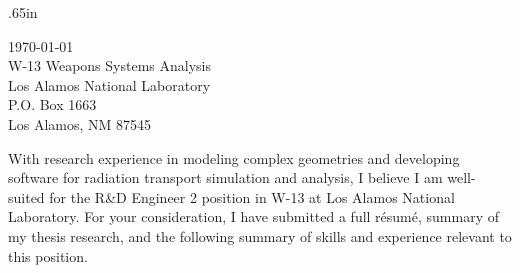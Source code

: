 
\begin{center}
\begin{minipage}{\textwidth}

  \normalsize

	\vspace{2mm}
  
  \begingroup
  \leftskip.65in
  \rightskip\leftskip

\today \\
W-13 Weapons Systems Analysis\\
Los Alamos National Laboratory \\
P.O. Box 1663 \\
Los Alamos, NM 87545
  
  \vspace{4mm} 

With research experience in modeling complex geometries and developing
software for radiation transport simulation and analysis, I believe I am
well-suited for the R\&D Engineer 2  position in W-13
at Los Alamos National Laboratory.
For your consideration, I have submitted a full r\'{e}sum\'{e}, summary of my thesis research, and
the following summary of skills and
experience relevant to this position. \\


\begin{itemize}[leftmargin=.875in,rightmargin=.875in,itemsep=1.0mm]


\end{itemize}
\end{minipage}
\end{center}
